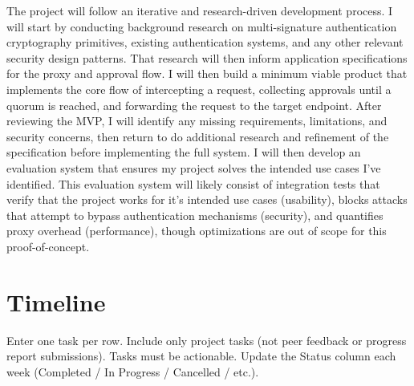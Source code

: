 \documentclass[12pt]{article}
\begin{document}
The project will follow an iterative and research-driven development process. I will start by conducting background research on multi-signature authentication cryptography primitives, existing authentication systems, and any other relevant security design patterns. That research will then inform application specifications for the proxy and approval flow. I will then build a minimum viable product that implements the core flow of intercepting a request, collecting approvals until a quorum is reached, and forwarding the request to the target endpoint. After reviewing the MVP, I will identify any missing requirements, limitations, and security concerns, then return to do additional research and refinement of the specification before implementing the full system. I will then develop an evaluation system that ensures my project solves the intended use cases I've identified. This evaluation system will likely consist of integration tests that verify that the project works for it's intended use cases (usability), blocks attacks that attempt to bypass authentication mechanisms (security), and quantifies proxy overhead (performance), though optimizations are out of scope for this proof-of-concept.

\section*{Timeline}

{\small Enter one task per row. Include only project tasks (not peer feedback
or progress report submissions). Tasks must be actionable. Update the Status
column each week (Completed / In Progress / Cancelled / etc.).}
\end{document}
